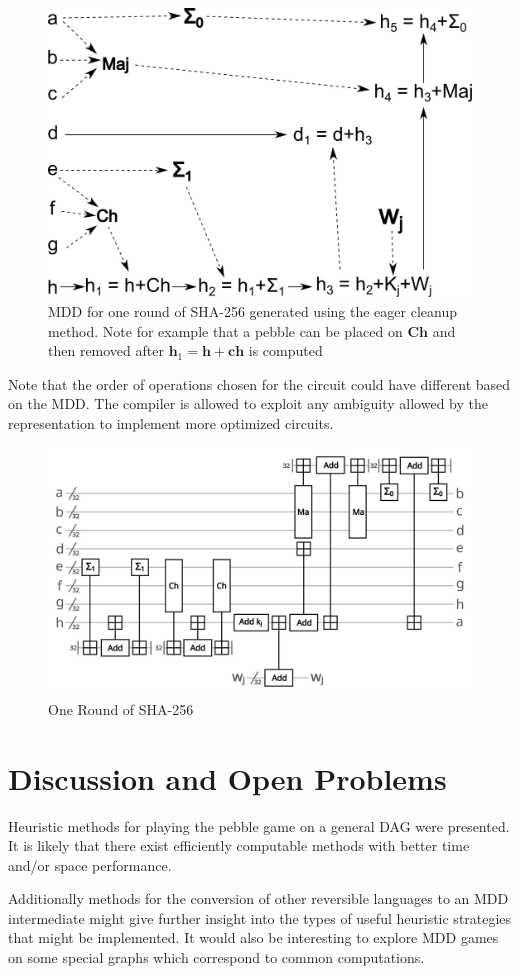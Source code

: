 \begin{figure}
      \capstart
      \centering
      \includegraphics[width=0.7\hsize]{images/sha_MDD}

      \caption{MDD for one round of SHA-256 generated using the eager cleanup
      method. Note for example that a pebble can be placed on $\mathbf{Ch}$ and
      then removed after $\mathbf{h}_1 = \mathbf{h}+\mathbf{ch}$ is computed}

      \label{fig:sha-MDD}
\end{figure}

Note that the order of operations chosen for the circuit could have different
based on the MDD. The compiler is allowed to exploit any ambiguity allowed by
the representation to implement more optimized circuits.

\begin{figure}
      \capstart
      \centering
      \includegraphics[width=0.9\hsize]{images/sha_round}
      \caption{One Round of SHA-256}
      \label{fig:sha}
\end{figure}

\section{Discussion and Open Problems}

Heuristic methods for playing the pebble game on a general DAG were presented.
It is likely that there exist efficiently computable methods with better time
and/or space performance.

Additionally methods for the conversion of other reversible languages to an MDD
intermediate might give further insight into the types of useful heuristic
strategies that might be implemented. It would also be interesting to explore
MDD games on some special graphs which correspond to common computations.
